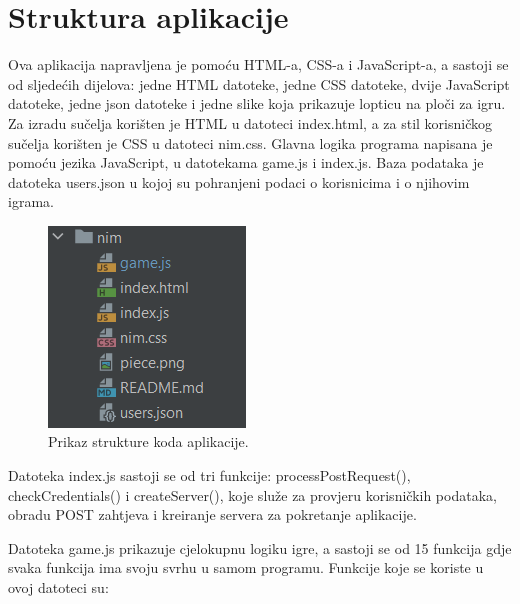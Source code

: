 \section{Struktura aplikacije}

Ova aplikacija napravljena je pomoću HTML-a, CSS-a i JavaScript-a, a sastoji se od sljedećih dijelova: jedne HTML datoteke, jedne CSS datoteke, dvije JavaScript datoteke, jedne json datoteke i jedne slike koja prikazuje lopticu na ploči za igru.  Za izradu sučelja korišten je HTML u datoteci index.html, a za stil korisničkog sučelja korišten je CSS u datoteci nim.css. Glavna logika programa napisana je pomoću jezika JavaScript, u datotekama game.js i index.js. Baza podataka je datoteka users.json u kojoj su pohranjeni podaci o korisnicima i o njihovim igrama.

\begin{figure}[H]
\centering
\includegraphics[]{slike-kod/Slika1.png}
\caption{Prikaz strukture koda aplikacije.}
\label{}
\end{figure}

Datoteka index.js sastoji se od tri funkcije: processPostRequest(), checkCredentials() i createServer(), koje služe za provjeru korisničkih podataka, obradu POST zahtjeva i kreiranje servera za pokretanje aplikacije.

Datoteka game.js prikazuje cjelokupnu logiku igre, a sastoji se od 15 funkcija gdje svaka funkcija ima svoju svrhu u samom programu. Funkcije koje se koriste u ovoj datoteci su:


